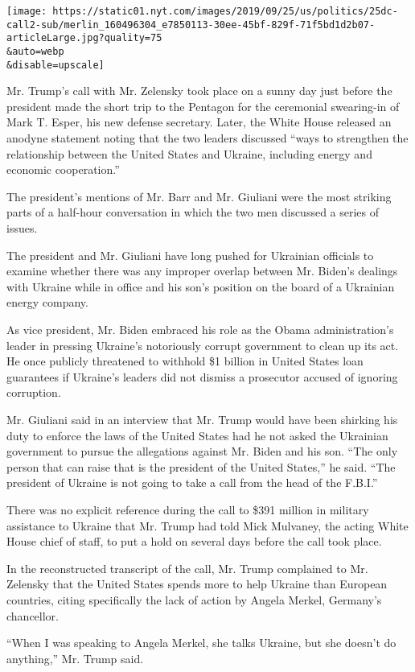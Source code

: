 \texttt{[image: https://static01.nyt.com/images/2019/09/25/us/politics/25dc-call2-sub/merlin\_160496304\_e7850113-30ee-45bf-829f-71f5bd1d2b07-articleLarge.jpg?quality=75\\\&auto=webp\\\&disable=upscale]}

Mr. Trump's call with Mr. Zelensky took place on a sunny day just before
the president made the short trip to the Pentagon for the ceremonial
swearing-in of Mark T. Esper, his new defense secretary. Later, the
White House released an anodyne statement noting that the two leaders
discussed ``ways to strengthen the relationship between the United
States and Ukraine, including energy and economic cooperation.''

The president's mentions of Mr. Barr and Mr. Giuliani were the most
striking parts of a half-hour conversation in which the two men
discussed a series of issues.

The president and Mr. Giuliani have long pushed for Ukrainian officials
to examine whether there was any improper overlap between Mr. Biden's
dealings with Ukraine while in office and his son's position on the
board of a Ukrainian energy company.

As vice president, Mr. Biden embraced his role as the Obama
administration's leader in pressing Ukraine's notoriously corrupt
government to clean up its act. He once publicly threatened to withhold
\$1 billion in United States loan guarantees if Ukraine's leaders did
not dismiss a prosecutor accused of ignoring corruption.

Mr. Giuliani said in an interview that Mr. Trump would have been
shirking his duty to enforce the laws of the United States had he not
asked the Ukrainian government to pursue the allegations against Mr.
Biden and his son. ``The only person that can raise that is the
president of the United States,'' he said. ``The president of Ukraine is
not going to take a call from the head of the F.B.I.''

There was no explicit reference during the call to \$391 million in
military assistance to Ukraine that Mr. Trump had told Mick Mulvaney,
the acting White House chief of staff, to put a hold on several days
before the call took place.

In the reconstructed transcript of the call, Mr. Trump complained to Mr.
Zelensky that the United States spends more to help Ukraine than
European countries, citing specifically the lack of action by Angela
Merkel, Germany's chancellor.

``When I was speaking to Angela Merkel, she talks Ukraine, but she
doesn't do anything,'' Mr. Trump said.

